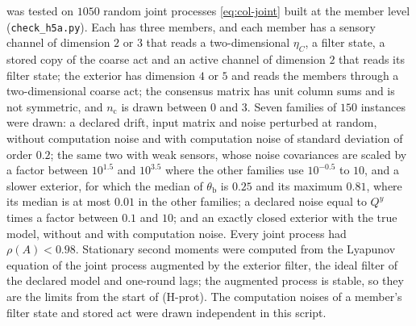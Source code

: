 \begin{numcheck}\label{chk:apx-h5a}
 was tested on $1050$ random joint processes \eqref{eq:col-joint} built at the member level (\texttt{check\_h5a.py}). Each has three members, and each member has a sensory channel of dimension $2$ or $3$ that reads a two-dimensional $\eta_C$, a filter state, a stored copy of the coarse act and an active channel of dimension $2$ that reads its filter state; the exterior has dimension $4$ or $5$ and reads the members through a two-dimensional coarse act; the consensus matrix has unit column sums and is not symmetric, and $n_{\mathrm c}$ is drawn between $0$ and $3$. Seven families of $150$ instances were drawn: a declared drift, input matrix and noise perturbed at random, without computation noise and with computation noise of standard deviation of order $0.2$; the same two with weak sensors, whose noise covariances are scaled by a factor between $10^{1.5}$ and $10^{3.5}$ where the other families use $10^{-0.5}$ to $10$, and a slower exterior, for which the median of $\theta_{\mathrm b}$ is $0.25$ and its maximum $0.81$, where its median is at most $0.01$ in the other families; a declared noise equal to $Q^y$ times a factor between $0.1$ and $10$; and an exactly closed exterior with the true model, without and with computation noise. Every joint process had $\rho(A)<0.98$. Stationary second moments were computed from the Lyapunov equation of the joint process augmented by the exterior filter, the ideal filter of the declared model and one-round lags; the augmented process is stable, so they are the limits from the start of (H-prot). The computation noises of a member's filter state and stored act were drawn independent in this script.


\end{numcheck}
